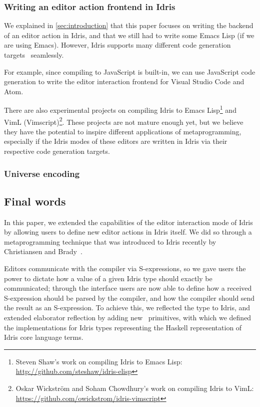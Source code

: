 \subsubsection{Writing an editor action frontend in Idris}

We explained in \autoref{sec:introduction} that this paper focuses on writing
the backend of an editor action in Idris, and that we still had to write some
Emacs Lisp (if we are using Emacs). However, Idris supports many different
code generation targets~\cite{idriscodegen} seamlessly.

For example, since compiling to JavaScript is built-in, we can use JavaScript
code generation to write the editor interaction frontend for Visual Studio Code
and Atom.

There are also experimental projects on compiling Idris to Emacs
Lisp\footnote{Steven Shaw's work on compiling Idris to Emacs Lisp:
\url{http://github.com/steshaw/idris-elisp}} and VimL
(Vimscript)\footnote{Oskar Wickstr\"om and Soham Chowdhury's work on
compiling Idris to VimL:
\url{https://github.com/owickstrom/idris-vimscript}}. These projects are not
mature enough yet, but we believe they have the potential to inspire different
applications of metaprogramming, especially if the Idris modes of these editors
are written in Idris via their respective code generation targets.

\subsubsection{Universe encoding}


\subsection{Final words}

In this paper, we extended the capabilities of the editor interaction mode of
Idris by allowing users to define new editor actions in Idris itself. We did
so through a metaprogramming technique that was introduced to Idris recently by
Christiansen and Brady~\cite{elabref}.

Editors communicate with the compiler via S-expressions, so we gave users the
power to dictate how a value of a given Idris type should exactly be
communicated; through the  interface users are now able to
define how a received S-expression should be parsed by the compiler, and how
the compiler should send the result as an S-expression. To achieve this, we
reflected the  type to Idris, and extended elaborator reflection
by adding new \Elab\ primitives, with which we defined the 
implementations for Idris types representing the Haskell representation of
Idris core language terms.

